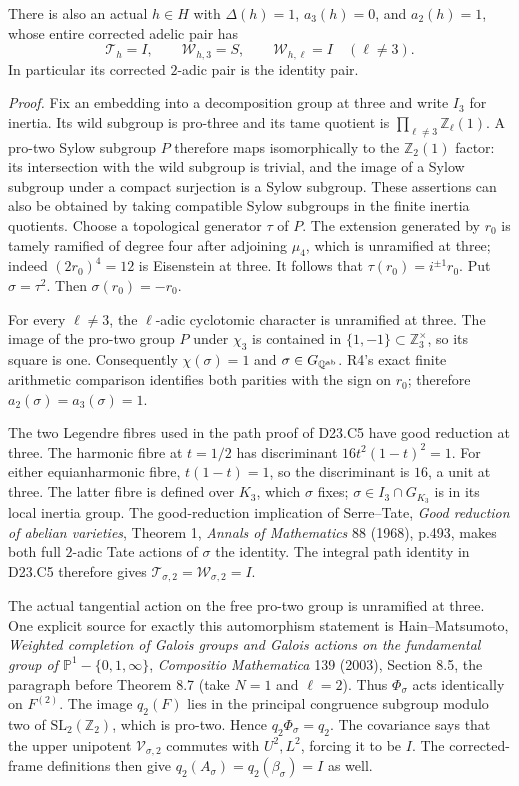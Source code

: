 There is also an actual $h\in H$
with $\Delta(h)=1$, $a_3(h)=0$, and $a_2(h)=1$, whose entire
corrected adelic pair has
\[
 \mathcal T_h=I,\qquad
 \mathcal W_{h,3}=S,\qquad
 \mathcal W_{h,\ell}=I\quad(\ell\ne3).
\]
In particular its corrected $2$-adic pair is the identity pair.

\emph{Proof.}
Fix an embedding into a decomposition group at three and write
$I_3$ for inertia.  Its wild subgroup is pro-three and its tame
quotient is $\prod_{\ell\ne3}\mathbb Z_\ell(1)$.  A pro-two
Sylow subgroup $P$ therefore maps isomorphically to the
$\mathbb Z_2(1)$ factor: its intersection with the wild subgroup
is trivial, and the image of a Sylow subgroup under a compact
surjection is a Sylow subgroup.  These assertions can also be
obtained by taking compatible Sylow subgroups in the finite
inertia quotients.  Choose a topological generator $\tau$ of $P$.
The extension generated by $r_0$ is tamely ramified of degree
four after adjoining $\mu_4$, which is unramified at three;
indeed $(2r_0)^4=12$ is Eisenstein at three.  It follows that
$\tau(r_0)=i^{\pm1}r_0$.  Put $\sigma=\tau^2$.  Then
$\sigma(r_0)=-r_0$.

For every $\ell\ne3$, the $\ell$-adic cyclotomic character is
unramified at three.  The image of the pro-two group $P$ under
$\chi_3$ is contained in $\{1,-1\}\subset\mathbb Z_3^\times$,
so its square is one.  Consequently $\chi(\sigma)=1$ and
$\sigma\in G_{\mathbb Q^{\rm ab}}$.  R4's exact finite arithmetic
comparison identifies both parities with the sign on $r_0$;
therefore $a_2(\sigma)=a_3(\sigma)=1$.

The two Legendre fibres used in the path proof of D23.C5 have
good reduction at three.  The harmonic fibre at $t=1/2$ has
discriminant $16t^2(1-t)^2=1$.  For either equianharmonic fibre,
$t(1-t)=1$, so the discriminant is $16$, a unit at three.
The latter fibre is defined over $K_3$, which $\sigma$ fixes;
$\sigma\in I_3\cap G_{K_3}$ is in its local inertia group.
The good-reduction implication of Serre--Tate,
\emph{Good reduction of abelian varieties}, Theorem 1,
\emph{Annals of Mathematics} 88 (1968), p.493, makes both full
$2$-adic Tate actions of $\sigma$ the identity.  The integral
path identity in D23.C5 therefore gives
$\mathcal T_{\sigma,2}=\mathcal W_{\sigma,2}=I$.

The actual tangential action on the free pro-two group is
unramified at three.  One explicit source for exactly this
automorphism statement is Hain--Matsumoto,
\emph{Weighted completion of Galois groups and Galois actions on
the fundamental group of $\mathbb P^1-\{0,1,\infty\}$},
\emph{Compositio Mathematica} 139 (2003), Section 8.5,
the paragraph before Theorem 8.7 (take $N=1$ and $\ell=2$).
Thus $\Phi_\sigma$ acts identically on $F^{(2)}$.
The image $q_2(F)$ lies in the principal congruence subgroup
modulo two of $\mathrm{SL}_2(\mathbb Z_2)$, which is pro-two.
Hence $q_2\Phi_\sigma=q_2$.  The covariance says that the
upper unipotent $\mathcal V_{\sigma,2}$ commutes with $U^2,L^2$,
forcing it to be $I$.  The corrected-frame definitions then give
$q_2(A_\sigma)=q_2(\beta_\sigma)=I$ as well.

